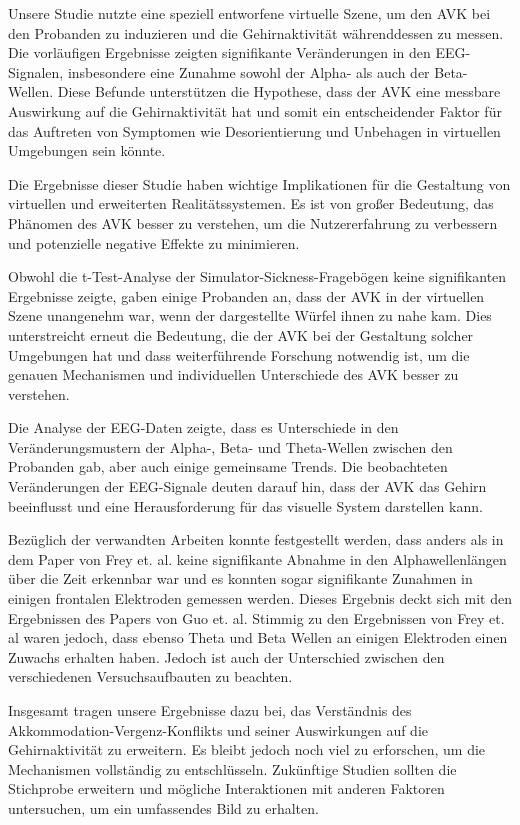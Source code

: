 \documentclass[conference]{IEEEtran}
\begin{document}
Unsere Studie nutzte eine speziell entworfene virtuelle Szene, um den AVK bei den Probanden zu induzieren und die Gehirnaktivität währenddessen zu messen. Die vorläufigen Ergebnisse zeigten signifikante Veränderungen in den EEG-Signalen, insbesondere eine Zunahme sowohl der Alpha- als auch der Beta-Wellen. Diese Befunde unterstützen die Hypothese, dass der AVK eine messbare Auswirkung auf die Gehirnaktivität hat und somit ein entscheidender Faktor für das Auftreten von Symptomen wie Desorientierung und Unbehagen in virtuellen Umgebungen sein könnte.

Die Ergebnisse dieser Studie haben wichtige Implikationen für die Gestaltung von virtuellen und erweiterten Realitätssystemen. Es ist von großer Bedeutung, das Phänomen des AVK besser zu verstehen, um die Nutzererfahrung zu verbessern und potenzielle negative Effekte zu minimieren.

Obwohl die t-Test-Analyse der Simulator-Sickness-Fragebögen keine signifikanten Ergebnisse zeigte, gaben einige Probanden an, dass der AVK in der virtuellen Szene unangenehm war, wenn der dargestellte Würfel ihnen zu nahe kam. Dies unterstreicht erneut die Bedeutung, die der AVK bei der Gestaltung solcher Umgebungen hat und dass weiterführende Forschung notwendig ist, um die genauen Mechanismen und individuellen Unterschiede des AVK besser zu verstehen.

Die Analyse der EEG-Daten zeigte, dass es Unterschiede in den Veränderungsmustern der Alpha-, Beta- und Theta-Wellen zwischen den Probanden gab, aber auch einige gemeinsame Trends. Die beobachteten Veränderungen der EEG-Signale deuten darauf hin, dass der AVK das Gehirn beeinflusst und eine Herausforderung für das visuelle System darstellen kann.

Bezüglich der verwandten Arbeiten konnte festgestellt werden, dass anders als in dem Paper von Frey et. al. keine signifikante Abnahme in den Alphawellenlängen über die Zeit erkennbar war und es konnten sogar signifikante Zunahmen in einigen frontalen Elektroden gemessen werden. Dieses Ergebnis deckt sich mit den Ergebnissen des Papers von Guo et. al. Stimmig zu den Ergebnissen von Frey et. al waren jedoch, dass ebenso Theta und Beta Wellen an einigen Elektroden einen Zuwachs erhalten haben. Jedoch ist auch der Unterschied zwischen den verschiedenen Versuchsaufbauten zu beachten.

Insgesamt tragen unsere Ergebnisse dazu bei, das Verständnis des Akkommodation-Vergenz-Konflikts und seiner Auswirkungen auf die Gehirnaktivität zu erweitern. Es bleibt jedoch noch viel zu erforschen, um die Mechanismen vollständig zu entschlüsseln. Zukünftige Studien sollten die Stichprobe erweitern und mögliche Interaktionen mit anderen Faktoren untersuchen, um ein umfassendes Bild zu erhalten.
\end{document}
